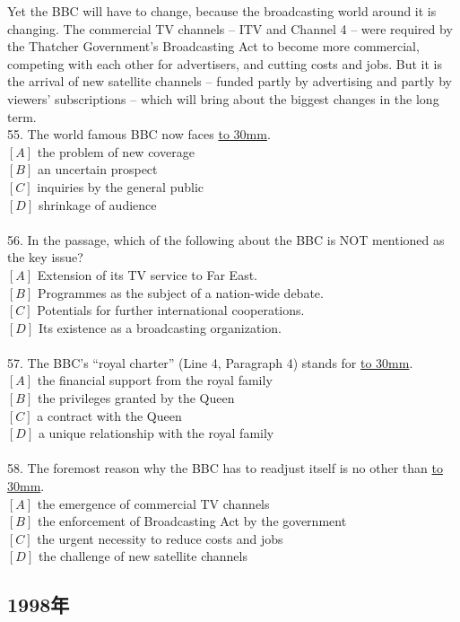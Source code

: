 \documentclass[a4paper]{article}
\begin{document}
\par
Yet the BBC will have to change, because the broadcasting world around it is changing. The commercial TV channels – ITV and Channel 4 -- were required by the Thatcher Government’s Broadcasting Act to become more commercial, competing with each other for advertisers, and cutting costs and jobs. But it is the arrival of new satellite channels -- funded partly by advertising and partly by viewers’ subscriptions -- which will bring about the biggest changes in the long term.
\\55.	The world famous BBC now faces \underline{\hbox to 30mm{}}.\\$[A]$ the problem of new coverage\\$[B]$ an uncertain prospect\\$[C]$ inquiries by the general public\\$[D]$ shrinkage of audience\\\\56.	In the passage, which of the following about the BBC is NOT mentioned as the key issue?\\$[A]$ Extension of its TV service to Far East.\\$[B]$ Programmes as the subject of a nation-wide debate.\\$[C]$ Potentials for further international cooperations.\\$[D]$ Its existence as a broadcasting organization.\\\\57.	The BBC’s “royal charter” (Line 4, Paragraph 4) stands for \underline{\hbox to 30mm{}}.\\$[A]$ the financial support from the royal family\\$[B]$ the privileges granted by the Queen\\$[C]$ a contract with the Queen\\$[D]$ a unique relationship with the royal family\\\\58.	The foremost reason why the BBC has to readjust itself is no other than \underline{\hbox to 30mm{}}.\\$[A]$ the emergence of commercial TV channels\\$[B]$ the enforcement of Broadcasting Act by the government\\$[C]$ the urgent necessity to reduce costs and jobs\\$[D]$ the challenge of new satellite channels\\\subsection{1998年}
\end{document}
